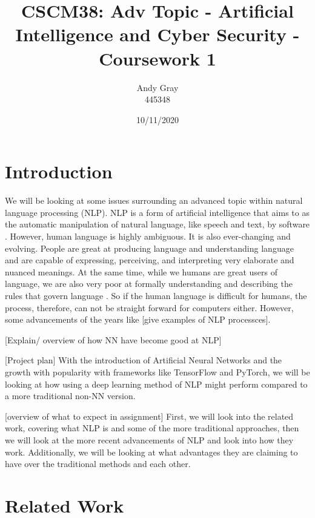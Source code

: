 \documentclass[a4paper,10pt]{article}
\begin{document}
\title{CSCM38: Adv Topic - Artificial Intelligence and Cyber Security - Coursework 1}
\author{Andy Gray\\445348}
\date{10/11/2020}

\maketitle

\section{Introduction}
\label{sec:intro}
	We will be looking at some issues surrounding an advanced topic within natural language processing (NLP).  NLP is a form of artificial intelligence that aims to as the automatic manipulation of natural language, like speech and text, by software \cite{nlp_definition}. However, human language is highly ambiguous. It is also ever-changing and evolving. People are great at producing language and understanding language and are capable of expressing, perceiving, and interpreting very elaborate and nuanced meanings. At the same time, while we humans are great users of language, we are also very poor at formally understanding and describing the rules that govern language \cite{goldberg2017neural}. So if the human language is difficult for humans, the process, therefore, can not be straight forward for computers either. However, some advancements of the years like [give examples of NLP processces].
	
	[Explain/ overview of how NN have become good at NLP]
	
	[Project plan] With the introduction of Artificial Neural Networks and the growth with popularity with frameworks like TensorFlow and PyTorch, we will be looking at how using a deep learning method of NLP might perform compared to a more traditional non-NN version.
	
	[overview of what to expect in assignment]
	First, we will look into the related work, covering what NLP is and some of the more traditional approaches, then we will look at the more recent advancements of NLP and look into how they work. Additionally, we will be looking at what advantages they are claiming to have over the traditional methods and each other.

\section{Related Work}
\label{sec:related_work}
\end{document}
